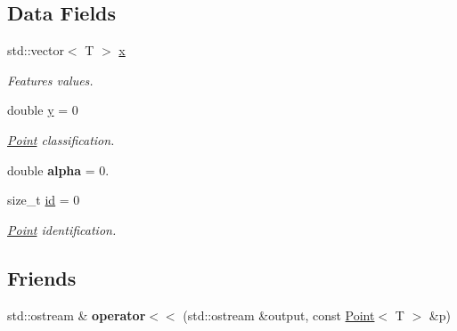 \subsection*{Data Fields}
\begin{DoxyCompactItemize}
\item 
std\+::vector$<$ T $>$ \hyperlink{class_point_a8b8cc26f89935fdc83ed464c053c0476}{x}\hypertarget{class_point_a8b8cc26f89935fdc83ed464c053c0476}{}\label{class_point_a8b8cc26f89935fdc83ed464c053c0476}

\begin{DoxyCompactList}\small\item\em Features values. \end{DoxyCompactList}\item 
double \hyperlink{class_point_abd1a56102bc430eb08fc37dac9aa4c0b}{y} = 0\hypertarget{class_point_abd1a56102bc430eb08fc37dac9aa4c0b}{}\label{class_point_abd1a56102bc430eb08fc37dac9aa4c0b}

\begin{DoxyCompactList}\small\item\em \hyperlink{class_point}{Point} classification. \end{DoxyCompactList}\item 
double {\bfseries alpha} = 0.\hypertarget{class_point_aa852a1c045d196abd841a6e1e87c27d8}{}\label{class_point_aa852a1c045d196abd841a6e1e87c27d8}

\item 
size\+\_\+t \hyperlink{class_point_af7d6dfc3296421e9f10311d29720aa3b}{id} = 0\hypertarget{class_point_af7d6dfc3296421e9f10311d29720aa3b}{}\label{class_point_af7d6dfc3296421e9f10311d29720aa3b}

\begin{DoxyCompactList}\small\item\em \hyperlink{class_point}{Point} identification. \end{DoxyCompactList}\end{DoxyCompactItemize}
\subsection*{Friends}
\begin{DoxyCompactItemize}
\item 
std\+::ostream \& {\bfseries operator$<$$<$} (std\+::ostream \&output, const \hyperlink{class_point}{Point}$<$ T $>$ \&p)\hypertarget{class_point_ae01781a3264312efb15b109d37fceb38}{}\label{class_point_ae01781a3264312efb15b109d37fceb38}

\end{DoxyCompactItemize}


